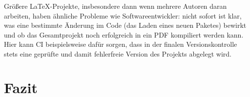 \documentclass{dtk}
\begin{document}
Größere \LaTeX-Projekte, insbesondere dann wenn mehrere Autoren daran arbeiten, haben ähnliche Probleme wie Softwareentwickler: nicht sofort ist klar, was eine bestimmte Änderung im Code (das Laden eines neuen Paketes) bewirkt und ob das Gesamtprojekt noch erfolgreich in ein PDF kompiliert werden kann. Hier kann CI beispielsweise dafür sorgen, dass in der finalen Versionskontrolle stets eine geprüfte und damit fehlerfreie Version des Projekts abgelegt wird.





\section{Fazit}
\end{document}
